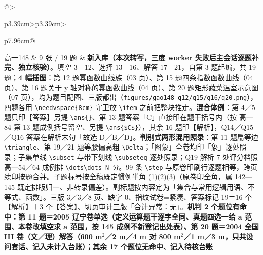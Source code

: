 \documentclass[a4paper,11pt]{article}
\begin{document}
\begin{xltabular}{\textwidth}{@{}>{\raggedright\arraybackslash}p{3.39cm}>{\centering\arraybackslash}p{3.39cm}>{\raggedright\arraybackslash}p{7.96cm}@{}}
高一148 & 9 张 / 19 题 & \textbf{新入库（本次转写，三度 worker 失败后主会话逐题补完、独立核验）}。填空 3---12、选择 13---16、解答 17---21，自第 3 题起编，共 19 题；\textbf{4 幅插图}：第 12 题幂函数曲线族（03 页）、第 15 题四条指数函数曲线（04 页）、第 16 题关于 y 轴对称的幂函数曲线（04 页）、第 20 题矩形蔬菜温室示意图（07 页），均为题目配图、三版都出（\texttt{figures/\allowbreak{}gao148\_q12/\allowbreak{}q15/\allowbreak{}q16/\allowbreak{}q20.png}），四题各用 \texttt{\textbackslash{}needvspace\{8cm\}} 守卫放 \texttt{\textbackslash{}item} 之前把整块推走。\textbf{混合体例}：第 4／5 题只印【答案】另提 \texttt{\textbackslash{}ans\{\}}、第 13 题答案「C」直接印在题干括号内（按 高一84 第 13 题成例括号留空、另提 \texttt{\textbackslash{}ans\{\$C\$\}}），其余 16 题印【解析】，Q14／Q15／Q16 答案在解析末句「故选 D／B／D」。\textbf{判别式两形混用照录}：第 11 题扁等边 \texttt{\textbackslash{}triangle}、第 19／21 题等腰偏高粗 \texttt{\textbackslash{}Delta}；「图象」全卷均印「象」逐处照录；子集单线 \texttt{\textbackslash{}subset} 与带下划线 \texttt{\textbackslash{}subseteq} 逐处照录；Q19 解析 7 处评分档照 高一54／64 成例排 \texttt{\textbackslash{}dots\textbackslash{}dots\ N\ 分}。99 条 \texttt{\textbackslash{}step} 与原卷印刷行逐题相等，跨页续印按题合并。子题标号按全稿既定惯例半角 (1)(2)(3)（原卷印全角，属 142---145 既定排版归一、非转录偏差）。副标题按内容定为「集合与常用逻辑用语、不等式、函数」。三版 3／3／8 页、缺字 0、指纹试卷=紧凑、答案标记 19＝16 个【解析】＋3 个【答案】、切页审计三版「合计异常：无」。\textbf{机判 2 个题位有命中：第 11 题＝2005 辽宁卷单选（定义运算题干逐字全同、真题四选一给 a 范围、本卷改填空求 a 范围，按 145 成例不新登记出处表）、第 20 题＝2004 全国 III 卷（文／理）解答（600 m$^{2}$／2 m／4 m 对 800 m$^{2}$／1 m／3 m，只共设问套话、记入未计入台账）；其余 17 个题位无命中、记入待核台账} \\ \addlinespace[1pt]

\end{xltabular}
\end{document}
